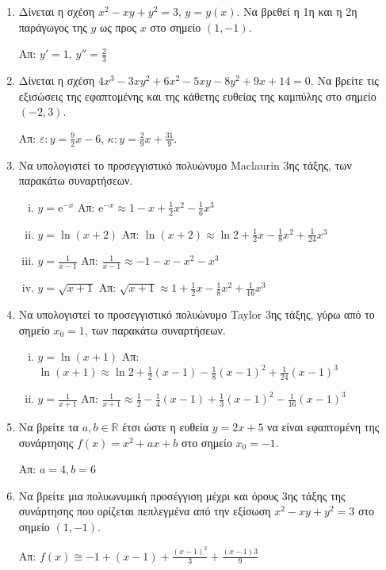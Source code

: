 \begin{enumerate}
  \item Δίνεται η σχέση $ x^{2} - xy + y^{2} = 3 $, $ y=y(x) $. Να βρεθεί η 1η
    και η 2η παράγωγος της $y$ ως προς $x$ στο σημείο $ (1,-1) $.

    \hfill Απ: $ y' = 1$, $ y'' = \frac{2}{3} $

  \item Δίνεται η σχέση $ 4x^{3} - 3xy^{2} + 6x^{2} - 5xy - 8 y^{2} + 9x + 14
    = 0$. Να βρείτε τις εξισώσεις της εφαπτομένης και της κάθετης ευθείας
    της καμπύλης στο σημείο $ (-2,3) $.

    \hfill Απ: $\varepsilon\colon y = \frac{9}{2} x - 6 $, 
    $\kappa\colon y = \frac{2}{9} x + \frac{31}{9} $.

  \item Να υπολογιστεί το προσεγγιστικό πολυώνυμο Maclaurin 3ης τάξης, των 
    παρακάτω συναρτήσεων.
    \begin{enumerate}[i)]
      \item $ y= \mathrm{e}^{-x} $ 
        \hfill Απ: $ \mathrm{e}^{-x} \approx 1-x+ \frac{1}{2} x^{2} - \frac{1}{6} x^{3} $ 
      \item $ y= \ln{(x+2)} $ 
        \hfill Απ: $ \ln{(x+2)} \approx \ln{2} + \frac{1}{2} x - \frac{1}{8} x^{2} +
        \frac{1}{24} x^{3} $ 
      \item $ y= \frac{1}{x-1} $ \hfill Απ: $ \frac{1}{x-1} \approx -1 -x -x^{2} - x^{3} $ 
      \item $ y= \sqrt{x+1} $ \hfill Απ: $ \sqrt{x+1} \approx 1 + \frac{1}{2} x -
        \frac{1}{8} x^{2} + \frac{1}{16} x^{3} $ 
    \end{enumerate}

  \item  Να υπολογιστεί το προσεγγιστικό πολυώνυμο Taylor 3ης τάξης, γύρω από 
    το σημείο $ x_{0}=1 $, των παρακάτω συναρτήσεων.
    \begin{enumerate}[i)]
      \item $ y= \ln{(x+1)} $ 
        \hfill Απ: $ \ln{(x+1)} \approx \ln{2} + \frac{1}{2} (x-1) - \frac{1}{8}
        (x-1)^{2} + \frac{1}{24} (x-1)^{3} $ 
      \item $ y= \frac{1}{x+1} $ \hfill Απ: $ \frac{1}{x+1} \approx \frac{1}{2} -
        \frac{1}{4} (x-1) + \frac{1}{3} (x-1)^{2} - \frac{1}{16} (x-1)^{3} $ 
    \end{enumerate}

  \item Να βρείτε τα $ a, b \in \mathbb{R} $ έτσι ώστε η ευθεία $ y = 2x + 5
    $ να είναι εφαπτομένη της συνάρτησης $ f(x) = x^{2} + ax + b $ στο
    σημείο $ x_{0} = -1 $. 

    \hfill Απ: $ a = 4, b = 6 $

  \item Να βρείτε μια πολυωνυμική προσέγγιση μέχρι και 
    όρους 3ης τάξης της συνάρτησης που ορίζεται πεπλεγμένα από την εξίσωση 
    $ x^{2} - xy + y^{2} = 3$ στο σημείο $ (1,-1) $.

    \hfill Απ: $f(x) \cong -1 + (x-1) + \frac{(x-1)^{2}}{3} +
    \frac{(x-1){3}}{9}$


\end{enumerate}




